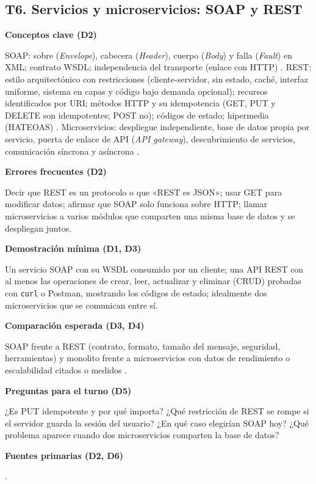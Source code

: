 \documentclass[11pt,a4paper]{article}
\newcommand{\campo}[1]{\par\smallskip\textbf{\color{uteqBlue}#1}\par}
\begin{document}
\subsection{T6. Servicios y microservicios: SOAP y REST}
\begin{fichaBox}[title={Ficha T6 --- SOAP, REST y microservicios}]
	\campo{Conceptos clave (D2)}
	SOAP: sobre (\emph{Envelope}), cabecera (\emph{Header}), cuerpo (\emph{Body}) y falla (\emph{Fault}) en XML; contrato WSDL; independencia del transporte (enlace con HTTP) \cite{w3c2007soap}. REST: estilo arquitectónico con restricciones (cliente-servidor, sin estado, caché, interfaz uniforme, sistema en capas y código bajo demanda opcional); recursos identificados por URI; métodos HTTP y su idempotencia (GET, PUT y DELETE son idempotentes; POST no); códigos de estado; hipermedia (HATEOAS) \cite{fielding2002principled}. Microservicios: despliegue independiente, base de datos propia por servicio, puerta de enlace de API (\emph{API gateway}), descubrimiento de servicios, comunicación síncrona y asíncrona \cite{newman2021building,aksakalli2021deployment}.
	\campo{Errores frecuentes (D2)}
	Decir que REST es un protocolo o que «REST es JSON»; usar GET para modificar datos; afirmar que SOAP solo funciona sobre HTTP; llamar microservicios a varios módulos que comparten una misma base de datos y se despliegan juntos.
	\campo{Demostración mínima (D1, D3)}
	Un servicio SOAP con su WSDL consumido por un cliente; una API REST con al menos las operaciones de crear, leer, actualizar y eliminar (CRUD) probadas con \texttt{curl} o Postman, mostrando los códigos de estado; idealmente dos microservicios que se comunican entre sí.
	\campo{Comparación esperada (D3, D4)}
	SOAP frente a REST (contrato, formato, tamaño del mensaje, seguridad, herramientas) y monolito frente a microservicios con datos de rendimiento o escalabilidad citados o medidos \cite{blinowski2022monolithic}.
	\campo{Preguntas para el turno (D5)}
	¿Es PUT idempotente y por qué importa? ¿Qué restricción de REST se rompe si el servidor guarda la sesión del usuario? ¿En qué caso elegirían SOAP hoy? ¿Qué problema aparece cuando dos microservicios comparten la base de datos?
	\campo{Fuentes primarias (D2, D6)}
	\cite{w3c2007soap,fielding2002principled,newman2021building,blinowski2022monolithic,aksakalli2021deployment}.
\end{fichaBox}

\end{document}
